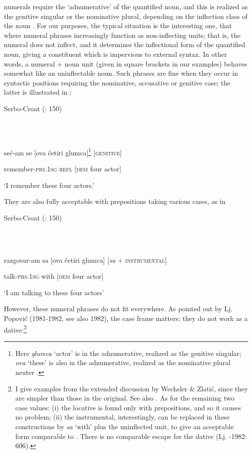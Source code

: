 \documentclass[output=paper]{langscibook}
\begin{document}
numerals require the ‘adnumerative’ of the quantified noun, and this is realized as the genitive singular or the nominative plural, depending on the inflection class of the noun \citep[159-160]{Corbett2009}. For our purposes, the typical situation is the interesting one, that where numeral phrases increasingly function as non-inflecting units; that is, the numeral does not inflect, and it determines the inflectional form of the quantified noun, giving a constituent which is impervious to external syntax. In other words, a numeral + noun unit (given in square brackets in our examples) behaves somewhat like an uninflectable noun. Such phrases are fine when they occur in syntactic positions requiring the nominative, accusative or genitive case; the latter is illustrated in :

Serbo-Croat (\citealt{WechslerZlatić2003}: 150)

\ea%
    \label{ex:key:23}
    \gll \\
         \\
    \glt
    \z %

          seć-am  se  [ova četiri glumca]\footnote{ \textrm{Here} \textrm{\textit{glumca}} \textrm{‘actor’ is in the adnumerative, realized as the genitive singular;} \textrm{\textit{ova}} \textrm{‘these’ is also in the adnumerative, realized as the nominative plural neuter \citep[17-18]{Corbett2023}.}}    [\textsc{genitive}]

  remember-\textsc{prs}.1\textsc{sg}  \textsc{refl}  [\textsc{dem} four actor]

  ‘I remember these four actors.’

They are also fully acceptable with prepositions taking various cases, as in 

Serbo-Croat (\citealt{WechslerZlatić2003}: 150)

\ea%
    \label{ex:key:24}
    \gll \\
         \\
    \glt
    \z %

          razgovar-am   sa  [ova četiri glumca]    [\textit{sa} + \textsc{instrumental}]

  talk-\textsc{prs}.1\textsc{sg}  with  [\textsc{dem} four actor]

  ‘I am talking to these four actors’

However, these numeral phrases do not fit everywhere. As pointed out by Lj. Popović (1981-1982, see also 1982), the case frame matters: they do not work as a dative:\footnote{\textrm{I give examples from the extended discussion by Wechsler \& Zlatić, since they are simpler than those in the original. See also \citet[374-375]{Browne1993a}. As for the remaining two case values: (i) the locative is found only with prepositions, and so it causes no problem; (ii) the instrumental, interestingly, can be replaced in these constructions by} \textrm{\textit{sa} }\textrm{‘with’ plus the uninflected unit, to give an acceptable form comparable to . There is no comparable escape for the dative (Lj. \citealt{Popović1981}-1982: 606).}}
\end{document}
